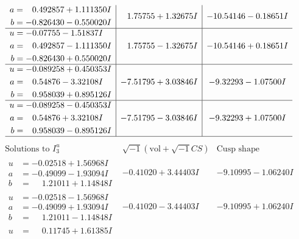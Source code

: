 \documentclass[1p]{elsarticle_modified}
\theoremstyle{definition}
\newcommand{\I}{\sqrt{-1}}
\begin{document}
$$\begin{array}{c|c|c}
\begin{aligned}
a &= \phantom{-}0.492857 + 1.111350 I \\
b &= -0.826430 - 0.550020 I\end{aligned}
 & \phantom{-}1.75755 + 1.32675 I & -10.54146 - 0.18651 I \\ \hline\begin{aligned}
u &= -0.07755 - 1.51837 I \\
a &= \phantom{-}0.492857 - 1.111350 I \\
b &= -0.826430 + 0.550020 I\end{aligned}
 & \phantom{-}1.75755 - 1.32675 I & -10.54146 + 0.18651 I \\ \hline\begin{aligned}
u &= -0.089258 + 0.450353 I \\
a &= \phantom{-}0.54876 - 3.32108 I \\
b &= \phantom{-}0.958039 + 0.895126 I\end{aligned}
 & -7.51795 + 3.03846 I & -9.32293 - 1.07500 I \\ \hline\begin{aligned}
u &= -0.089258 - 0.450353 I \\
a &= \phantom{-}0.54876 + 3.32108 I \\
b &= \phantom{-}0.958039 - 0.895126 I\end{aligned}
 & -7.51795 - 3.03846 I & -9.32293 + 1.07500 I\\
 \hline 
 \end{array}$$\newpage$$\begin{array}{c|c|c}  
\text{Solutions to }I^u_{3}& \I (\text{vol} + \sqrt{-1}CS) & \text{Cusp shape}\\
 \hline 
\begin{aligned}
u &= -0.02518 + 1.56968 I \\
a &= -0.49099 - 1.93094 I \\
b &= \phantom{-}1.21011 + 1.14848 I\end{aligned}
 & -0.41020 + 3.44403 I & -9.10995 - 1.06240 I \\ \hline\begin{aligned}
u &= -0.02518 - 1.56968 I \\
a &= -0.49099 + 1.93094 I \\
b &= \phantom{-}1.21011 - 1.14848 I\end{aligned}
 & -0.41020 - 3.44403 I & -9.10995 + 1.06240 I \\ \hline\begin{aligned}
u &= \phantom{-}0.11745 + 1.61385 I \\

\end{aligned}
\end{array}$$
\end{document}
